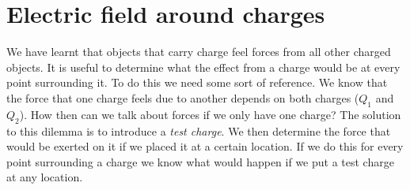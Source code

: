 \section{Electric field around charges}


We have learnt that objects that carry charge feel forces from all
other charged objects. It is useful to determine what the effect
from a charge would be at every point surrounding it. To do this we
need some sort of reference. We know that the force that one
charge feels due to another depends on both charges ($Q_1$ and
$Q_2$). How then can we talk about forces if we only have one
charge? The solution to this dilemma is to introduce a \emph{test
charge}. We then determine the force that would be exerted on it
if we placed it at a certain location. If we do this for every
point surrounding a charge we know what would happen if we put a
test charge at any location.\\

